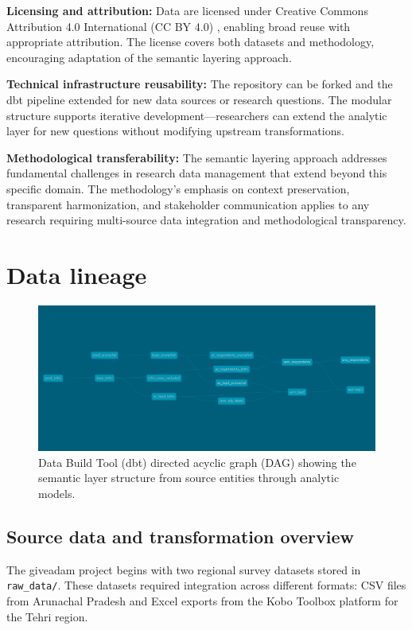\documentclass{article}
\begin{document}
\textbf{Licensing and attribution:} Data are licensed under Creative Commons Attribution 4.0 International (CC BY 4.0) \cite{creative_commons}, enabling broad reuse with appropriate attribution. The license covers both datasets and methodology, encouraging adaptation of the semantic layering approach.

\textbf{Technical infrastructure reusability:} The repository can be forked and the dbt pipeline extended for new data sources or research questions. The modular structure supports iterative development—researchers can extend the analytic layer for new questions without modifying upstream transformations.

\textbf{Methodological transferability:} The semantic layering approach addresses fundamental challenges in research data management that extend beyond this specific domain. The methodology's emphasis on context preservation, transparent harmonization, and stakeholder communication applies to any research requiring multi-source data integration and methodological transparency.

\section{Data lineage}
\label{sec:data-lineage}

\begin{figure}[ht]
\centering
\includegraphics[width=\textwidth]{img/dbt-dag.png}
\caption{Data Build Tool (dbt) directed acyclic graph (DAG) showing the semantic layer structure from source entities through analytic models.}
\label{fig:dbtdag}
\end{figure}

\subsection{Source data and transformation overview}

The giveadam project begins with two regional survey datasets stored in \texttt{raw\_data/}. These datasets required integration across different formats: CSV files \cite{csv_rfc} from Arunachal Pradesh and Excel exports from the Kobo Toolbox \cite{kobo_toolbox} platform for the Tehri region. 
\end{document}
